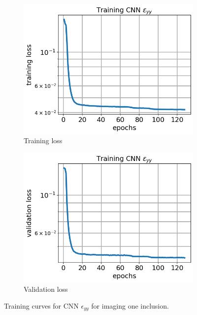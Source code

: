 \documentclass[12pt]{article}
\newcommand{\nhgfigheight}{4.0cm}
\begin{document}
\begin{figure}[h]
  \centering
  \begin{subfigure}[b]{0.45\linewidth}
    \includegraphics[totalheight=\nhgfigheight]{Figures/final1/training/eyy/field_strainyy_plot_loss.png}
    \caption{Training loss}
  \end{subfigure}
  \begin{subfigure}[b]{0.45\linewidth}
    \includegraphics[totalheight=\nhgfigheight]{Figures/final1/training/eyy/field_strainyy_plot_val_loss.png}
    \caption{Validation loss}
  \end{subfigure}
\caption{\label{fig:oneinc:traineyy} Training curves for CNN $\epsilon_{yy}$ for imaging one inclusion.}
\end{figure} 
\end{document}
